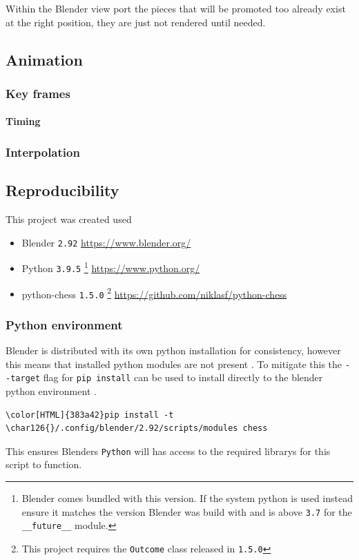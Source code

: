 \documentclass[11pt]{article}
\begin{document}
Within the Blender view port the pieces that will be promoted too already exist
at the right position, they are just not rendered until needed.
\subsection{Animation}
\label{sec:orgfe6ae7e}
\subsubsection{Key frames}
\label{sec:org5302bf1}
\paragraph{Timing}
\label{sec:org4fb0dfd}
\subsubsection{Interpolation}
\label{sec:orgf3662a2}
\subsection{Reproducibility}
\label{sec:org4a86698}
This project was created used
\begin{itemize}
\item Blender \texttt{2.92}
\url{https://www.blender.org/}
\item Python \texttt{3.9.5} \footnote{Blender comes bundled with this version. If the system python is used
instead ensure it matches the version Blender was build with and is above \texttt{3.7} for the \texttt{\_\_future\_\_} module.}
\url{https://www.python.org/}
\item python-chess \texttt{1.5.0} \footnote{This project requires the \texttt{Outcome} class released in \texttt{1.5.0}}
\url{https://github.com/niklasf/python-chess}
\end{itemize}
\subsubsection{Python environment}
\label{sec:org9c5c68b}
Blender is distributed with its own python installation for consistency, however
this means that installed python modules are not present
\cite{blender-python-env}. To mitigate this the \texttt{-{}-target} flag for \texttt{pip install}
can be used to install directly to the blender python environment
\cite{pip-install-man}.
\begin{Code}
\begin{Verbatim}[]
\color[HTML]{383a42}pip install -t \char126{}/.config/blender/2.92/scripts/modules chess
\end{Verbatim}
\end{Code}
This ensures Blenders \texttt{Python} will has access to the required librarys for this
script to function.
\end{document}
